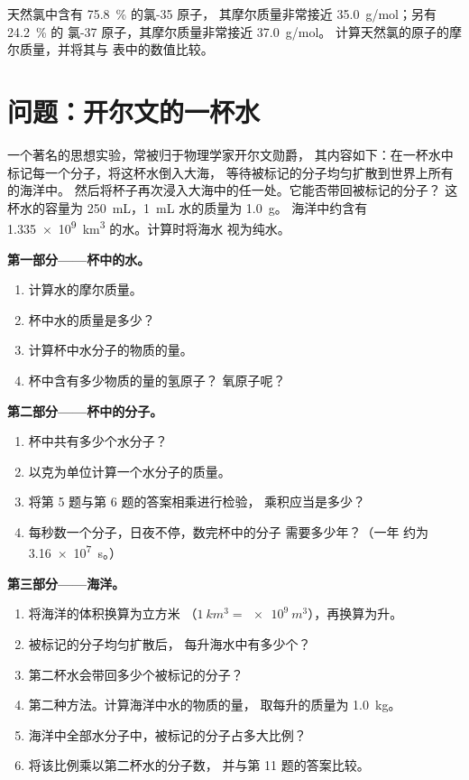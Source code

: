 \begin{exercise}[$\star\star\star$]\label{exo:g10:the-mole:15}
天然氯中含有 \qty{75.8}{\percent} 的氯-35 原子，
其摩尔质量非常接近 \qty{35.0}{g/mol}；另有 \qty{24.2}{\percent} 的
氯-37 原子，其摩尔质量非常接近 \qty{37.0}{g/mol}。
计算天然氯的原子的摩尔质量，并将其与
表中的数值比较。
\end{exercise}

\section{问题：开尔文的一杯水}

\begin{problem}
\label{pb:g10:the-mole:1}
一个著名的思想实验，常被归于物理学家开尔文勋爵，
其内容如下：在一杯水中标记每一个分子，将这杯水倒入大海，
等待被标记的分子均匀扩散到世界上所有的海洋中。
然后将杯子再次浸入大海中的任一处。它能否带回被标记的分子？
这杯水的容量为
\qty{250}{mL}，\qty{1}{mL} 水的质量为 \qty{1.0}{g}。
海洋中约含有 \qty{1.335e9}{km^3} 的水。计算时将海水
视为纯水。

\medskip
\noindent\textbf{第一部分——杯中的水。}
\begin{enumerate}
  \item 计算水的摩尔质量。
  \item 杯中水的质量是多少？
  \item 计算杯中水分子的物质的量。
  \item 杯中含有多少物质的量的氢原子？
        氧原子呢？
\end{enumerate}

\medskip
\noindent\textbf{第二部分——杯中的分子。}
\begin{enumerate}[resume]
  \item 杯中共有多少个水分子？
  \item 以克为单位计算一个水分子的质量。
  \item 将第 5 题与第 6 题的答案相乘进行检验，
        乘积应当是多少？
  \item 每秒数一个分子，日夜不停，数完杯中的分子
        需要多少年？（一年
        约为 \qty{3.16e7}{s}。）
\end{enumerate}

\medskip
\noindent\textbf{第三部分——海洋。}
\begin{enumerate}[resume]
  \item 将海洋的体积换算为立方米
        （$\qty{1}{km^3} = \qty{e9}{m^3}$），再换算为升。
  \item 被标记的分子均匀扩散后，
        每升海水中有多少个？
  \item 第二杯水会带回多少个被标记的分子？
  \item 第二种方法。计算海洋中水的物质的量，
        取每升的质量为 \qty{1.0}{kg}。
  \item 海洋中全部水分子中，被标记的分子占多大比例？
  \item 将该比例乘以第二杯水的分子数，
        并与第 11 题的答案比较。
\end{enumerate}


\end{problem}
